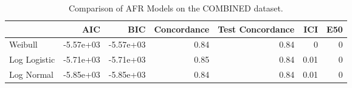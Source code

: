 \begin{table*}
\centering
\caption{Comparison of AFR Models on the COMBINED dataset.}
\label{tab:combined}
\begin{tabular}{lrrrrrr}
\toprule
 & AIC & BIC & Concordance & Test Concordance & ICI & E50 \\
\midrule
Weibull & -5.57e+03 & -5.57e+03 & 0.84 & 0.84 & 0 & 0 \\
Log Logistic & -5.71e+03 & -5.71e+03 & 0.85 & 0.84 & 0.01 & 0 \\
Log Normal & -5.85e+03 & -5.85e+03 & 0.84 & 0.84 & 0.01 & 0 \\
\bottomrule
\end{tabular}
\end{table*}
